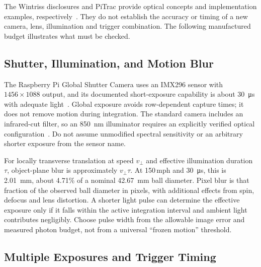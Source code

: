 The Wintriss disclosures and PiTrac provide optical concepts and implementation examples, respectively~\cite{us7292711,pitrac}.
They do not establish the accuracy or timing of a new camera, lens, illumination and trigger combination.
The following manufactured budget illustrates what must be checked.

\subsection{Shutter, Illumination, and Motion Blur}

The Raspberry Pi Global Shutter Camera uses an IMX296 sensor with $1456\times1088$ output, and its documented short-exposure capability is about \SI{30}{\micro\second} with adequate light~\cite{pigsproduct,pigscam}.
Global exposure avoids row-dependent capture times; it does not remove motion during integration.
The standard camera includes an infrared-cut filter, so an \SI{850}{\nano\meter} illuminator requires an explicitly verified optical configuration~\cite{pigscam}.
Do not assume unmodified spectral sensitivity or an arbitrary shorter exposure from the sensor name.

For locally transverse translation at speed $v_\perp$ and effective illumination duration $\tau$, object-plane blur is approximately $v_\perp\tau$.
At 150\,mph and \SI{30}{\micro\second}, this is \SI{2.01}{\milli\meter}, about 4.71\% of a nominal \SI{42.67}{\milli\meter} ball diameter.
Pixel blur is that fraction of the observed ball diameter in pixels, with additional effects from spin, defocus and lens distortion.
A shorter light pulse can determine the effective exposure only if it falls within the active integration interval and ambient light contributes negligibly.
Choose pulse width from the allowable image error and measured photon budget, not from a universal ``frozen motion'' threshold.

\subsection{Multiple Exposures and Trigger Timing}

